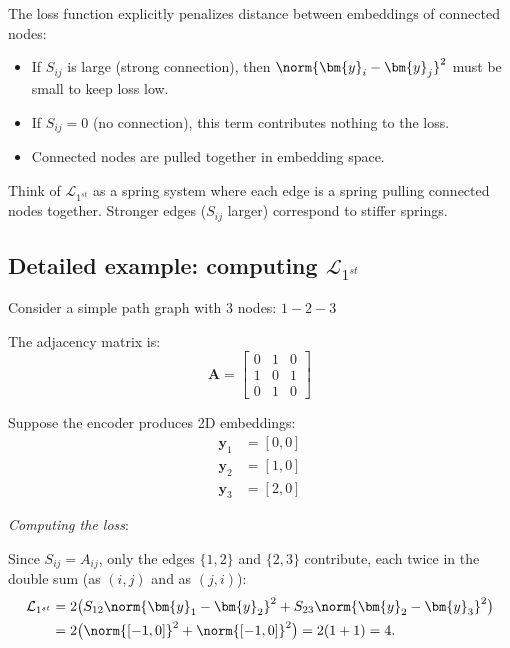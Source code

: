 \begin{notechapter}
The loss function explicitly penalizes distance between embeddings of connected nodes:

\begin{itemize}
    \item If $S_{ij}$ is large (strong connection), then $\norm{\bm{y}_i - \bm{y}_j}^2$ must be small to keep loss low.
    \item If $S_{ij} = 0$ (no connection), this term contributes nothing to the loss.
    \item Connected nodes are pulled together in embedding space.
\end{itemize}

\begin{intuition}
Think of $\mathcal{L}_{1^{st}}$ as a spring system where each edge is a spring pulling connected nodes together. Stronger edges ($S_{ij}$ larger) correspond to stiffer springs.
\end{intuition}

\subsection{Detailed example: computing $\mathcal{L}_{1^{st}}$}

\begin{example}
Consider a simple path graph with 3 nodes: $1 - 2 - 3$

The adjacency matrix is:
\[
\bm{A} = \begin{bmatrix}
0 & 1 & 0 \\
1 & 0 & 1 \\
0 & 1 & 0
\end{bmatrix}
\]

Suppose the encoder produces 2D embeddings:
\begin{align*}
\bm{y}_1 &= [0, 0] \\
\bm{y}_2 &= [1, 0] \\
\bm{y}_3 &= [2, 0]
\end{align*}

\emph{Computing the loss}:

Since $S_{ij} = A_{ij}$, only the edges $\{1,2\}$ and $\{2,3\}$ contribute, each twice in the double sum (as $(i,j)$ and as $(j,i)$):
\begin{align*}
\mathcal{L}_{1^{st}} &= 2\bigl(S_{12} \norm{\bm{y}_1 - \bm{y}_2}^2 + S_{23} \norm{\bm{y}_2 - \bm{y}_3}^2\bigr) \\
&= 2\bigl(\norm{[-1,0]}^2 + \norm{[-1,0]}^2\bigr) = 2(1 + 1) = 4 .
\end{align*}


\end{example}
\end{notechapter}
